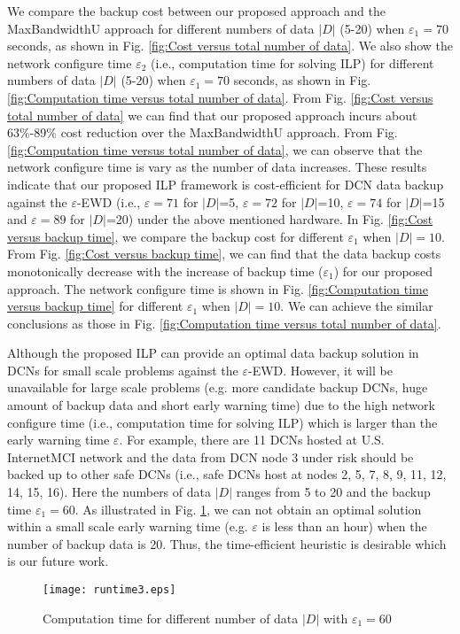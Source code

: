 \documentclass[conference]{IEEEtran}\IEEEoverridecommandlockouts
\begin{document}
We compare the backup cost between our proposed approach and the MaxBandwidthU approach for different numbers of data $|D|$ (5-20) when  $\varepsilon_{1}=70$ seconds,  as shown in Fig. \ref{fig:Cost versus total number of data}.  We also show the network configure time $\varepsilon_{2}$ (i.e., computation time for solving ILP) for different numbers of data $|D|$ (5-20) when  $\varepsilon_{1}=70$ seconds,  as shown in Fig. \ref{fig:Computation time versus total number of data}.
From Fig. \ref{fig:Cost versus total number of data} we can find that our proposed approach incurs about 63\%-89\% cost reduction over the  MaxBandwidthU approach. From Fig. \ref{fig:Computation time versus total number of data}, we can observe that the network configure time is vary as the number of data increases. These results indicate that our proposed ILP framework is cost-efficient for DCN data backup against the  $\varepsilon$-EWD (i.e., $\varepsilon=71$ for $|D|$=5,  $\varepsilon=72$ for $|D|$=10,  $\varepsilon=74$ for $|D|$=15 and $\varepsilon=89$ for $|D|$=20) under the above mentioned hardware. In Fig. \ref{fig:Cost versus backup time}, we compare the backup cost for different $\varepsilon_{1}$ when $|D|=10$. From Fig. \ref{fig:Cost versus backup time},  we can find that the data backup costs monotonically decrease with the increase of  backup time ($\varepsilon_{1}$) for our proposed approach. The network configure time is shown in Fig. \ref{fig:Computation time versus backup time} for different $\varepsilon_{1}$ when $|D|=10$. We can achieve the similar conclusions as those in Fig. \ref{fig:Computation time versus total number of data}.

Although the proposed ILP can provide an optimal data backup solution in DCNs for small scale problems against the $\varepsilon$-EWD. However, it will be unavailable for large scale problems (e.g. more candidate backup DCNs, huge amount of backup data and short early warning time) due to the high network configure time (i.e., computation time for solving ILP) which is larger than the early warning time $\varepsilon$. For example, there are 11 DCNs hosted at  U.S. InternetMCI network and the data from DCN node 3 under risk should be backed up to other safe DCNs (i.e., safe DCNs host at nodes 2, 5, 7, 8, 9, 11, 12, 14, 15, 16). Here the numbers of data $|D|$ ranges from 5 to 20 and the backup time $\varepsilon_{1}=60$.  As illustrated in Fig. \ref{fig1:Computation time versus total number of data $|D|$}, we can not obtain an optimal solution within a small scale early warning time (e.g. $\varepsilon$ is less than an hour) when the number of backup data is 20.  Thus, the time-efficient heuristic is desirable which is our future work.
\begin{figure}[t]
      \centering
      \texttt{[image: runtime3.eps]}
   \caption{Computation time for different number of data $|D|$ with $\varepsilon_{1}=60$}
   \label{fig1:Computation time versus total number of data $|D|$}
  \end{figure}
\end{document}
